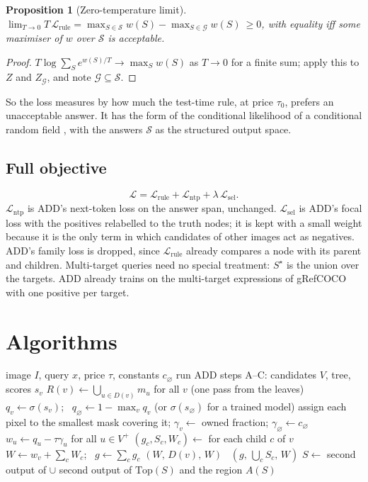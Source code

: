 \documentclass[11pt,a4paper]{article}
\newtheorem{proposition}{Proposition}
\theoremstyle{definition}
\theoremstyle{remark}
\newcommand{\nul}{\varnothing}
\newcommand{\cS}{\mathcal{S}}
\newcommand{\cG}{\mathcal{G}}
\newcommand{\Top}{\mathrm{Top}}
\begin{document}
\begin{proposition}[Zero-temperature limit]\label{prop:limit}
$\displaystyle\lim_{T\to0}T\,\mathcal{L}_{\mathrm{rule}}=\max_{S\in\cS}w(S)-\max_{S\in\cG}w(S)\ \ge0$, with equality iff
some maximiser of $w$ over $\cS$ is acceptable.
\end{proposition}
\begin{proof}
$T\log\sum_Se^{w(S)/T}\to\max_Sw(S)$ as $T\to0$ for a finite sum; apply this to $Z$ and $Z_\cG$, and note
$\cG\subseteq\cS$.
\end{proof}
\noindent So the loss measures by how much the test-time rule, at price $\tau_0$, prefers an unacceptable answer.
It has the form of the conditional likelihood of a conditional random field \cite{crf}, with the answers $\cS$ as
the structured output space.

\subsection{Full objective}
\[
\mathcal{L}=\mathcal{L}_{\mathrm{rule}}+\mathcal{L}_{\mathrm{ntp}}+\lambda\,\mathcal{L}_{\mathrm{sel}} .
\]
$\mathcal{L}_{\mathrm{ntp}}$ is ADD's next-token loss on the answer span, unchanged. $\mathcal{L}_{\mathrm{sel}}$ is
ADD's focal loss with the positives relabelled to the truth nodes; it is kept with a small weight because it is the
only term in which candidates of other images act as negatives. ADD's family loss is dropped, since
$\mathcal{L}_{\mathrm{rule}}$ already compares a node with its parent and children. Multi-target queries need no
special treatment: $S^\star$ is the union over the targets. ADD already trains on the multi-target expressions of
gRefCOCO with one positive per target.

\section{Algorithms}
\begin{algorithm}[H]
\caption{Answer for one query at price $\tau$}\label{alg:rule}
\begin{algorithmic}[1]
\Require image $I$, query $x$, price $\tau$, constants $c_\nul$
\State run ADD steps A--C: candidates $V$, tree, scores $s_v$
\State $R(v)\gets\bigcup_{u\in D(v)}m_u$ for all $v$ (one pass from the leaves)
\State $q_v\gets\sigma(s_v)$; \ $q_\nul\gets1-\max_vq_v$ (or $\sigma(s_\nul)$ for a trained model)
\State assign each pixel to the smallest mask covering it; $\gamma_v\gets$ owned fraction; $\gamma_\nul\gets c_\nul$
\State $w_u\gets q_u-\tau\gamma_u$ for all $u\in V^+$
  \State $(g_c,S_c,W_c)\gets$  for each child $c$ of $v$
  \State $W\gets w_v+\sum_cW_c$; \ $g\gets\sum_cg_c$
   \Return $(W,\,D(v),\,W)$
  \Else\ \Return $(g,\,\bigcup_cS_c,\,W)$
  \EndIf
\EndFunction
\State $S\gets$ second output of  $\cup$ second output of \Call{Solve}{$\nul$}
\State \Return $\Top(S)$ and the region $A(S)$
\end{algorithmic}
\end{algorithm}
\end{document}
